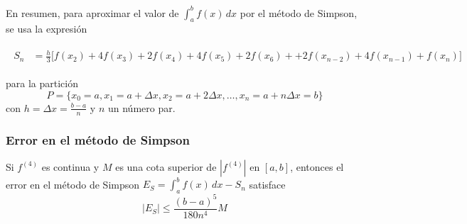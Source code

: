 En resumen, para aproximar el valor de $\int_{a}^{b}f(x)\,dx$ por el método de Simp\-son, se usa la expresión

\begin{gather*}
  \begin{aligned}
    S_{n}&=\frac{h}{3}\Big[f(x_{2})+4f(x_{3})+2f(x_{4})+4f(x_{5})+2f(x_{6})+
    +2f(x_{n-2})+4f(x_{n-1})+f(x_{n})\Big]
  \end{aligned}
\end{gather*}

para la partición
\[
  P=\{x_{0}=a,x_{1}=a+\Delta x,x_{2}=a+2\Delta x,\ldots,x_{n}=a+n\Delta x=b\}
\]
con $h=\Delta x=\frac{b-a}{n}$ y $n$ un número par.

\subsubsection{Error en el método de Simpson}

Si $f^{\left( 4\right) }$ es continua y $M$ es una cota superior de $\left\vert f^{\left( 4\right) }\right\vert$ en $\left[ a,b\right]$,
entonces el error en el método de Simpson $E_{S}=\int_{a}^{b}f(x)\,dx-S_{n}$
satisface
\[
  \left\vert E_{S}\right\vert \leq \frac{\left( b-a\right) ^{5}}{180n^{4}}M
\]

